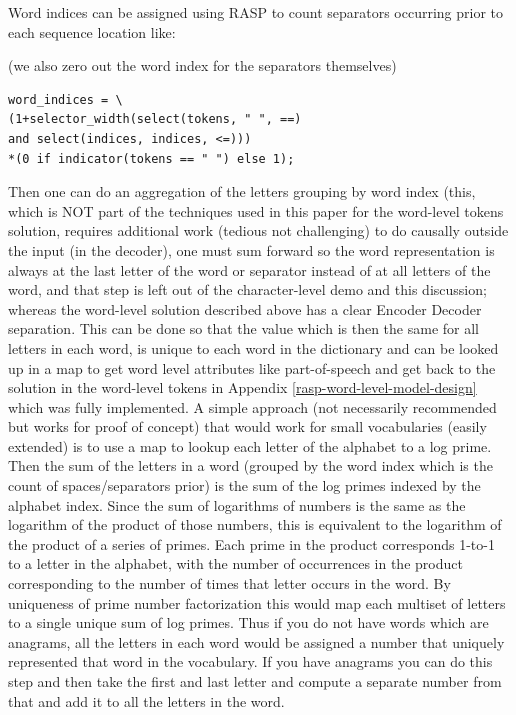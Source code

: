 \documentclass[11pt]{article}
\begin{document}
Word indices can be assigned using RASP to count separators occurring prior to each sequence location like:

(we also zero out the word index for the separators themselves)

\begin{tiny}
\begin{verbatim}
word_indices = \
(1+selector_width(select(tokens, " ", ==) 
and select(indices, indices, <=)))
*(0 if indicator(tokens == " ") else 1);
\end{verbatim}
\end{tiny}

Then one can do an aggregation of the letters grouping by word index (this, which is NOT part of the techniques used in this paper for the word-level tokens solution, requires additional work (tedious not challenging) to do causally outside the input (in the decoder), one must sum forward so the word representation is always at the last letter of the word or separator instead of at all letters of the word, and that step is left out of the character-level demo and this discussion; whereas the word-level solution described above has a clear Encoder Decoder separation. This can be done so that the value which is then the same for all letters in each word, is unique to each word in the dictionary and can be looked up in a map to get word level attributes like part-of-speech and get back to the solution in the word-level tokens in Appendix \ref{rasp-word-level-model-design} which was fully implemented. A simple approach (not necessarily recommended but works for proof of concept) that would work for small vocabularies (easily extended) is to use a map to lookup each letter of the alphabet to a log prime. Then the sum of the letters in a word (grouped by the word index which is the count of spaces/separators prior) is the sum of the log primes indexed by the alphabet index. Since the sum of logarithms of numbers is the same as the logarithm of the product of those numbers, this is equivalent to the logarithm of the product of a series of primes. Each prime in the product corresponds 1-to-1 to a letter in the alphabet, with the number of occurrences in the product corresponding to the number of times that letter occurs in the word. By uniqueness of prime number factorization this would map each multiset of letters to a single unique sum of log primes. Thus if you do not have words which are anagrams, all the letters in each word would be assigned a number that uniquely represented that word in the vocabulary. If you have anagrams you can do this step and then take the first and last letter and compute a separate number from that and add it to all the letters in the word.
\end{document}
